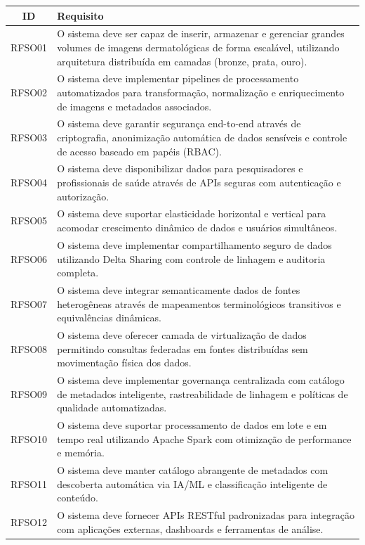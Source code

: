 \begin{table}[H]
    \centering
    \small
    \begin{tabular}{|c|p{12cm}|}
    \hline
    \textbf{ID} & \textbf{Requisito} \\ \hline
    RFSO01 & O sistema deve ser capaz de inserir, armazenar e gerenciar grandes volumes de imagens dermatológicas de forma escalável, utilizando arquitetura distribuída em camadas (bronze, prata, ouro). \\ \hline
    RFSO02 & O sistema deve implementar pipelines de processamento automatizados para transformação, normalização e enriquecimento de imagens e metadados associados. \\ \hline
    RFSO03 & O sistema deve garantir segurança end-to-end através de criptografia, anonimização automática de dados sensíveis e controle de acesso baseado em papéis (RBAC). \\ \hline
    RFSO04 & O sistema deve disponibilizar dados para pesquisadores e profissionais de saúde através de APIs seguras com autenticação e autorização. \\ \hline
    RFSO05 & O sistema deve suportar elasticidade horizontal e vertical para acomodar crescimento dinâmico de dados e usuários simultâneos. \\ \hline
    RFSO06 & O sistema deve implementar compartilhamento seguro de dados utilizando Delta Sharing com controle de linhagem e auditoria completa. \\ \hline
    RFSO07 & O sistema deve integrar semanticamente dados de fontes heterogêneas através de mapeamentos terminológicos transitivos e equivalências dinâmicas. \\ \hline
    RFSO08 & O sistema deve oferecer camada de virtualização de dados permitindo consultas federadas em fontes distribuídas sem movimentação física dos dados. \\ \hline
    RFSO09 & O sistema deve implementar governança centralizada com catálogo de metadados inteligente, rastreabilidade de linhagem e políticas de qualidade automatizadas. \\ \hline
    RFSO10 & O sistema deve suportar processamento de dados em lote e em tempo real utilizando Apache Spark com otimização de performance e memória. \\ \hline
    RFSO11 & O sistema deve manter catálogo abrangente de metadados com descoberta automática via IA/ML e classificação inteligente de conteúdo. \\ \hline
    RFSO12 & O sistema deve fornecer APIs RESTful padronizadas para integração com aplicações externas, dashboards e ferramentas de análise. \\ \hline

\end{tabular}
\end{table}
